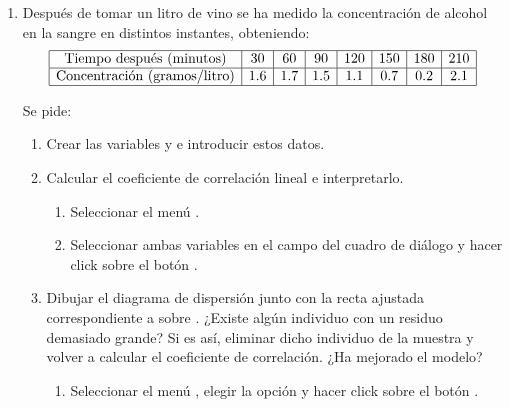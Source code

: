 \begin{enumerate}[leftmargin=*]
\item Después de tomar un litro de vino se ha medido la concentración de alcohol en la sangre en distintos instantes,
obteniendo:
\[
\begin{array}{|c|c|c|c|c|c|c|c|}
\hline 
\mbox{Tiempo después (minutos)} & 30 & 60 & 90 & 120 & 150 & 180 & 210\\ 
\hline
\mbox{Concentración (gramos/litro)} & 1.6 & 1.7 & 1.5 & 1.1 & 0.7 & 0.2 & 2.1\\
\hline
\end{array}
\]

Se pide:
\begin{enumerate}
\item Crear las variables  y  e 
introducir estos datos.
\item Calcular el coeficiente de correlación lineal e interpretarlo.
\begin{indicacion}
\begin{enumerate}
\item Seleccionar el menú .
\item Seleccionar ambas variables en el campo  del 
cuadro de diálogo y hacer click sobre el botón .
\end{enumerate}
\end{indicacion}

\item  Dibujar el diagrama de dispersión junto con la recta ajustada 
correspondiente a  sobre . 
¿Existe algún individuo con un residuo demasiado grande? Si es así, 
eliminar dicho individuo de la muestra y volver a calcular el 
coeficiente de correlación. ¿Ha mejorado el modelo?
\begin{indicacion}
\begin{enumerate}

\item Seleccionar el menú , elegir la opción  y  
hacer click sobre el botón . 


\end{enumerate}
\end{indicacion}
\end{enumerate}
\end{enumerate}
